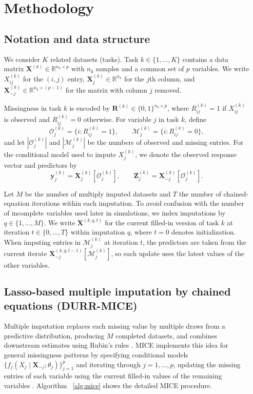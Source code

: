 \documentclass[12pt]{article}
\begin{document}
\section{Methodology}
\label{sec:method}

\subsection{Notation and data structure}
We consider $K$ related datasets (tasks). Task $k\in\{1,\dots,K\}$ contains a data matrix
$\bm{X}^{(k)}\in\mathbb{R}^{n_k\times p}$ with $n_k$ samples and a common set of $p$ variables.
We write $X^{(k)}_{ij}$ for the $(i,j)$ entry, $\bm{X}^{(k)}_j\in\mathbb{R}^{n_k}$ for the $j$th column,
and $\bm{X}^{(k)}_{-j}\in\mathbb{R}^{n_k\times(p-1)}$ for the matrix with column $j$ removed.

Missingness in task $k$ is encoded by $\bm{R}^{(k)}\in\{0,1\}^{n_k\times p}$, where $R^{(k)}_{ij}=1$
if $X^{(k)}_{ij}$ is observed and $R^{(k)}_{ij}=0$ otherwise. For variable $j$ in task $k$, define
\[
\mathcal{O}^{(k)}_j=\{i:R^{(k)}_{ij}=1\},\qquad
\mathcal{M}^{(k)}_j=\{i:R^{(k)}_{ij}=0\},
\]
and let $|\mathcal{O}^{(k)}_j|$ and $|\mathcal{M}^{(k)}_j|$ be the numbers of observed and missing entries.
For the conditional model used to impute $X^{(k)}_j$, we denote the observed response vector and predictors by
\[
\bm{y}^{(k)}_j=\bm{X}^{(k)}_j[\mathcal{O}^{(k)}_j],\qquad
\bm{Z}^{(k)}_j=\bm{X}^{(k)}_{-j}[\mathcal{O}^{(k)}_j].
\]

Let $M$ be the number of multiply imputed datasets and $T$ the number of chained-equation iterations within each imputation.
To avoid confusion with the number of incomplete variables used later in simulations, we index imputations by $q\in\{1,\dots,M\}$.
We write $\bm{X}^{(k,q,t)}$ for the current filled-in version of task $k$ at iteration $t\in\{0,\dots,T\}$ within imputation $q$,
where $t=0$ denotes initialization. When imputing entries in $\mathcal{M}^{(k)}_j$ at iteration $t$, the predictors are taken from the
current iterate $\bm{X}^{(k,q,t-1)}_{-j}[\mathcal{M}^{(k)}_j]$, so each update uses the latest values of the other variables.

\subsection{Lasso-based multiple imputation by chained equations (DURR-MICE)}
\label{subsec:durr_mice}
Multiple imputation replaces each missing value by multiple draws from a predictive distribution, producing $M$ completed datasets,
and combines downstream estimates using Rubin's rules \citep{rubin_multiple_1987}. MICE implements this idea for general missingness
patterns by specifying conditional models $\{f_j(X_j\mid \bm{X}_{-j};\theta_j)\}_{j=1}^p$ and iterating through $j=1,\dots,p$,
updating the missing entries of each variable using the current filled-in values of the remaining variables \citep{buuren_flexible_2018}. Algorithm ~\ref{alg:mice} shows the detailed MICE procedure.
\end{document}
